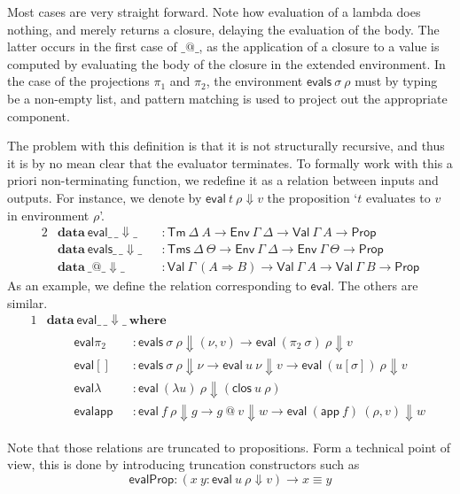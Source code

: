 \documentclass[a4paper,english,cleveref,autoref,draft]{lipics-v2019}
\newcommand{\agdaSymb}[1]{\mathsf{#1}}
\newcommand{\agdaKW}[1]{\mathbf{#1}}
\newcommand{\ind}{\hspace{1em}}
\newcommand{\data}{\agdaKW{data}}
\newcommand{\where}{\agdaKW{where}}
\newcommand{\Prop}{\agdaSymb{Prop}}
\newcommand{\Tms}{\agdaSymb{Tms}}
\newcommand{\Tm}{\agdaSymb{Tm}}
\newcommand{\app}{\agdaSymb{app}}
\newcommand{\lam}{\lambda}
\newcommand{\Val}{\agdaSymb{Val}}
\newcommand{\Env}{\agdaSymb{Env}}
\newcommand{\clos}{\agdaSymb{clos}}
\newcommand{\eval}{\agdaSymb{eval}}
\newcommand{\evals}{\agdaSymb{evals}}
\newcommand{\Ra}{\Rightarrow}
\newcommand{\Da}{\Downarrow}
\begin{document}
Most cases are very straight forward. Note how evaluation of a lambda does
nothing, and merely returns a closure, delaying the evaluation of the body.
The latter occurs in the first case of $\_@\_$, as the application of
a closure to a value is computed by evaluating the body of the closure in the
extended environment.
In the case of the projections $\pi_1$ and $\pi_2$, the environment $\evals\ \sigma\ \rho$
must by typing be a non-empty list, and pattern matching is used to project out
the appropriate component.

The problem with this definition is that it is not structurally recursive,
and thus it is by no mean clear that the evaluator terminates.
To formally work with this a priori non-terminating function, we redefine
it as a relation between inputs and outputs. For instance, we denote by
$\eval\ t\ \rho \Da v$ the proposition `$t$ evaluates to $v$ in environment $\rho$'.
\begin{alignat*}{2}
  & \data\ \eval\_\,\_\Da\_ && : \Tm\ \Delta\ A \to \Env\ \Gamma\ \Delta
                                 \to \Val\ \Gamma\ A \to \Prop \\
  & \data\ \evals\_\,\_\Da\_ && : \Tms\ \Delta\ \Theta \to \Env\ \Gamma\ \Delta
                                  \to \Env\ \Gamma\ \Theta \to \Prop \\
  & \data\ \_@\_\Da\_ && : \Val\ \Gamma\ (A \Ra B) \to \Val\ \Gamma\ A \to \Val\ \Gamma\ B \to \Prop
\end{alignat*}
As an example, we define the relation corresponding to $\eval$.
The others are similar.
\begin{alignat*}{1}
  & \data\ \eval\_\,\_\Da\_\ \where \\ & \ind
  \begin{alignedat}{2}
    & \eval\pi_2 && : \evals\ \sigma\ \rho \Da (\nu,v) \to \eval\ (\pi_2\ \sigma)\ \rho \Da v \\
    & \eval[]    && : \evals\ \sigma\ \rho \Da \nu \to \eval\ u\ \nu \Da v \to \eval\ (u[\sigma])\ \rho \Da v \\
    & \eval\lam  && : \eval\ (\lam u)\ \rho \Da (\clos\ u\ \rho) \\
    & \eval\app  && : \eval\ f\ \rho \Da g \to g\ @\ v \Da w \to \eval\ (\app\ f)\ (\rho,v) \Da w
  \end{alignedat}
\end{alignat*}

Note that those relations are truncated to propositions. Form a technical point
of view, this is done by introducing truncation constructors such as
\[ \eval\Prop : (x\ y : \eval\ u\ \rho \Da v) \to x \equiv y \]
\end{document}
